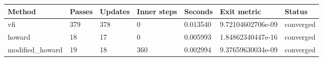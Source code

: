 \begin{tabular}{lllllll}
\hline
Method & Passes & Updates & Inner steps & Seconds & Exit metric & Status \\
\hline
vfi & 379 & 378 & 0 & 0.013540 & 9.72104602706e-09 & converged \\
howard & 18 & 17 & 0 & 0.005993 & 1.84862340447e-16 & converged \\
modified\_howard & 19 & 18 & 360 & 0.002994 & 9.37659630034e-09 & converged \\
\hline
\end{tabular}
